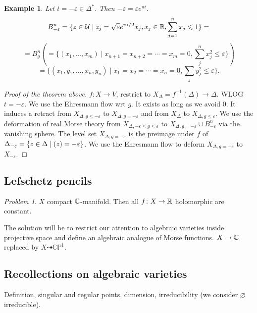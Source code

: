\documentclass[A4paper, british]{amsart}
\theoremstyle{darkgreentheorem}
\theoremstyle{darkbluedefinition}
\theoremstyle{darkredexample}
\newtheorem{exa}[thm]{Example}
\theoremstyle{remark}
\newtheorem{pbl}[thm]{Problem}
\let\Re\relax
\DeclareMathOperator{\Re}{Re}
\newcommand{\CP}{\mathbb{CP}}
\newcommand{\1}{\mathbbm{1}}
\begin{document}
\begin{exa}
    Let $t=-\varepsilon \in \Delta^{*}$.
    Then $-\varepsilon =\varepsilon e^{\pi i}$.
    \[ B_{-\varepsilon}^{n}=\{z\in \mathcal{U}\mid z_{j}=\sqrt{\varepsilon}e^{\pi i/2}x_{j},x_{j}\in \mathbb{R},\sum_{j=1}^{n}x_{j}\leqslant 1\}= \]
    \[ =B_{g}^{n}(=\{ (x_{1},\ldots,x_{m})\mid x_{n+1}=x_{n+2}=\cdots =x_{m}=0 ,\sum_{j}^{n} x_{j}^{2}\leqslant \varepsilon \}) \]
    \[ = \{ (x_{1},y_{1},\ldots,x_{n},y_{n})\mid x_{1}=x_{2}=\cdots=x_{n}=0,\sum_{j}y_{j}^{2}\leqslant \varepsilon \}.\]
\end{exa}

\begin{proof}[Proof of the theorem above]
    $f\colon X\to V$, restrict to $X_{\Delta}=f^{-1}(\Delta)\to \Delta$.
    WLOG $t=-\varepsilon$.
    We use the Ehresmann flow wrt $g$.
    It exists as long as we avoid $0$.
    It induces a retract from $X_{\Delta,g\leqslant -\varepsilon }$ to $X_{\Delta,g=-\varepsilon}$ and from $X_{\Delta}$ to $X_{\Delta,g\leqslant \varepsilon}$.
    We use the deformation of real Morse theory from $X_{\Delta, -\varepsilon \leqslant g\leqslant \varepsilon }$ to $X_{\Delta,g=-\varepsilon}\cup B_{-\varepsilon}^{n}$ via the vanishing sphere.
    The level set $X_{\Delta,g=-\varepsilon}$ is the preimage under $f$ of $\Delta_{-\varepsilon}=\{z\in \Delta\mid \Re(z)=-\varepsilon\}$.
    We use the Ehresmann flow to deform $X_{\Delta,g=-\varepsilon }$ to $X_{-\varepsilon}$.
\end{proof}

\subsection{Lefschetz pencils}

\begin{pbl}
    $X$ compact $\mathbb{C}$-manifold.
    Then all $f\colon X\to \mathbb{R}$ holomorphic are constant.
\end{pbl}

The solution will be to restrict our attention to algebraic varieties inside projective space and define an algebraic analogue of Morse functions.
$X\to \mathbb{C}$ replaced by $X\dashrightarrow \CP^{1}$.

\subsection{Recollections on algebraic varieties}
Definition, singular and regular points, dimension, irreducibility (we consider $\varnothing$ irreducible).
\end{document}
